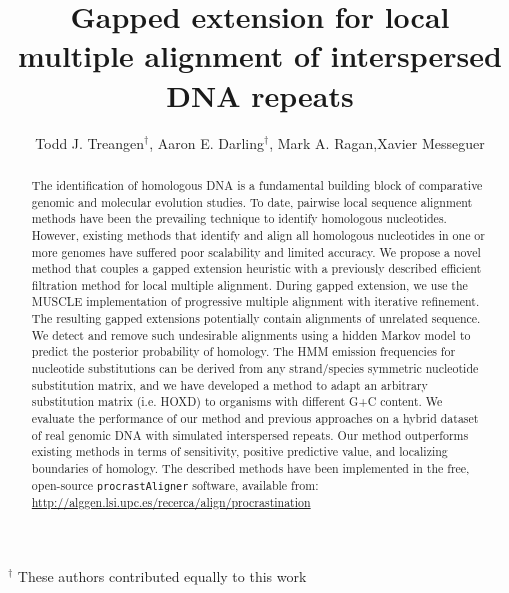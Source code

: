 \documentclass{llncs}
\begin{document}

\title{Gapped extension for local multiple alignment of interspersed DNA repeats}

\author{Todd J. Treangen$^\dag$, Aaron E. Darling$^\dag$, Mark A. Ragan,Xavier Messeguer}
%
%

\maketitle
{\center \scriptsize $^\dag$ These authors contributed equally to this work \\}

\begin{abstract}
The identification of homologous DNA is a fundamental building block
of comparative genomic and molecular evolution studies. To date,
pairwise local sequence alignment methods have been the prevailing
technique to identify homologous nucleotides. However, existing
methods that identify and align all homologous nucleotides in one or
more genomes have suffered poor scalability and limited accuracy. We
propose a novel method that couples a gapped extension heuristic with
a previously described efficient filtration method for local multiple
alignment.  During gapped extension, we use the MUSCLE implementation
of progressive multiple alignment with iterative refinement.  The
resulting gapped extensions potentially contain alignments of
unrelated sequence.  We detect and
remove such undesirable alignments using a hidden Markov model to
predict the posterior probability of homology. The HMM
emission frequencies for nucleotide substitutions can be derived from
any strand/species symmetric nucleotide substitution matrix, and we
have developed a method to adapt an arbitrary substitution matrix
(i.e. HOXD) to organisms with different G+C content. We evaluate the
performance of our method and previous approaches on a hybrid dataset
of real genomic DNA with simulated interspersed repeats.  Our method
outperforms existing methods in terms of sensitivity,
positive predictive value, and localizing boundaries of homology.  The
described methods have been implemented in the free, open-source
\texttt{procrastAligner} software, available from: \\
\url{http://alggen.lsi.upc.es/recerca/align/procrastination}
\end{abstract}
\end{document}
